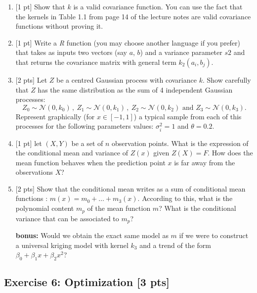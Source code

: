 \documentclass[a4paper,10pt]{article}
\begin{document}
\begin{enumerate}[label=Q\arabic*.]
\item {[1 pt]} Show that $k$ is a valid covariance function. You can use the fact that the kernels in Table 1.1 from page 14 of the lecture notes are valid covariance functions without proving it. 
\item {[1 pt]} Write a \emph{R} function (you may choose another language if you prefer) that takes as inputs two vectors (say $a$, $b$) and a variance parameter $s2$ and that returns the covariance matrix with general term $k_2(a_i,b_j)$.
\item {[2 pts]} Let $Z$ be a centred Gaussian process with covariance $k$. Show carefully that $Z$ has the same distribution as the sum of 4 independent Gaussian processes:
\begin{equation*}
Z_0 \sim \mathcal{N}(0,k_0)\, ,\ 
Z_1 \sim \mathcal{N}(0,k_1)\, ,\ 
Z_2 \sim \mathcal{N}(0,k_2)\text{ and } 
Z_3 \sim \mathcal{N}( 0,k_3).
\end{equation*}
Represent graphically (for $x \in [-1,1]$) a typical sample from each of this processes for the following parameters values: $\sigma_i^2 = 1$ and $\theta = 0.2$.
\item {[1 pt]} let $(X,Y)$ be a set of $n$ observation points. What is the expression of the conditional mean and variance of $Z(x)$ given $Z(X)=F$. How does the mean function behaves when the prediction point $x$ is far away from the observations $X$?
\item {[2 pts]} Show that the conditional mean writes as a sum of conditional mean functions : $m(x) = m_0 + \dots + m_3(x)$. According to this, what is the polynomial content $m_p$ of the mean function $m$? What is the conditional variance that can be associated to $m_p$?
\item[\textbf{bonus:}] Would we obtain the exact same model as $m$ if we were to construct a universal kriging model with kernel $k_3$ and a trend of the form $\beta_0 + \beta_1 x + \beta_2 x^2$?
\end{enumerate}

\subsection*{Exercise 6: Optimization \hfill [3 pts]}
\end{document}
